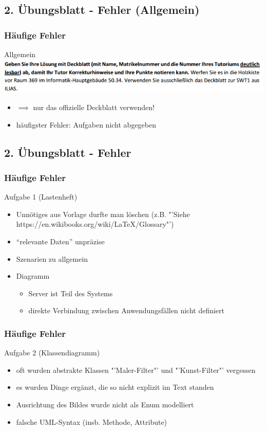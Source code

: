 \documentclass[18pt]{beamer}
\begin{document}
	
	\subsection{2. Übungsblatt - Fehler (Allgemein)}
	\begin{frame}
		\frametitle{Häufige Fehler}
		\begin{block}{Allgemein}
			\includegraphics[scale=0.6]{./pics/tut2/deckblatt.png}
			\begin{itemize}
				\item $\implies$ nur das offizielle Deckblatt verwenden!
				\pause
				\item häufigster Fehler: Aufgaben nicht abgegeben
			\end{itemize}
		\end{block}
	\end{frame}
	
	\subsection{2. Übungsblatt - Fehler}
	\begin{frame}
		\frametitle{Häufige Fehler}
		\begin{block}{Aufgabe 1 (Lastenheft)}
			\begin{itemize}
				\item Unnötiges aus Vorlage durfte man löschen (z.B. "'Siehe https://en.wikibooks.org/wiki/LaTeX/Glossary"')
				\pause
				\item \enquote{relevante Daten} unpräzise
				\pause
				\item Szenarien zu allgemein
				\pause
				\item Diagramm
				\begin{itemize}
					\item Server ist Teil des Systems
					\item direkte Verbindung zwischen Anwendungsfällen nicht definiert
				\end{itemize}
			\end{itemize}
		\end{block}
	\end{frame}

	\begin{frame}
		\frametitle{Häufige Fehler}
		\begin{block}{Aufgabe 2 (Klassendiagramm)}
			\begin{itemize}
				\item oft wurden abstrakte Klassen "'Maler-Filter"' und "'Kunst-Filter"' vergessen
				\pause
				\item es wurden Dinge ergänzt, die so nicht explizit im Text standen
				\pause
				\item Ausrichtung des Bildes wurde nicht als Enum modelliert
				\pause
				\item falsche UML-Syntax (insb. Methode, Attribute)
			\end{itemize}
		\end{block}
	\end{frame}
\end{document}
